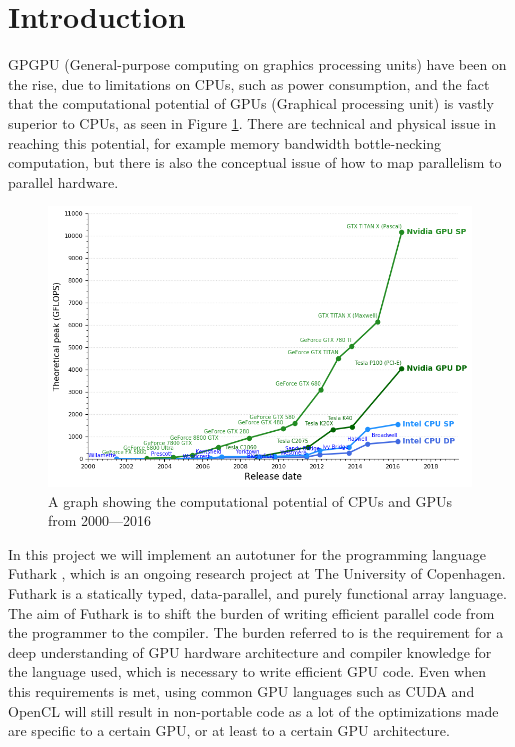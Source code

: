 \section{Introduction}
GPGPU (General-purpose computing on graphics processing units) have been on the
rise, due to limitations on CPUs, such as power consumption, and the fact
that the computational potential of GPUs (Graphical processing unit) is vastly
superior to CPUs, as seen in Figure \ref{potential}. There are technical and physical
issue in reaching this potential, for example memory bandwidth bottle-necking computation, but there is
also the conceptual issue of how to map parallelism to parallel hardware.
\begin{figure}[h]
	\centering
	\includegraphics[width=.8\textwidth]{resources/graf.png}
	\caption{A graph showing the computational potential of CPUs and GPUs from 2000---2016 \cite{cpu-vs-gpu}}
	\label{potential}
\end{figure}

In this project we will implement an autotuner for the programming language
Futhark \cite{futhark-home}, which is an ongoing research project at The University of Copenhagen. Futhark is a statically typed, data-parallel, and
purely functional array language. The aim of Futhark is to shift the burden of
writing efficient parallel code from the programmer to the compiler. The
burden referred to is the requirement for a deep understanding of GPU hardware architecture and compiler knowledge for the language used, which is necessary to write efficient GPU code. Even when this requirements is met, using common GPU languages such as CUDA and OpenCL will still result in non-portable code as a lot of the optimizations made
are specific to a certain GPU, or at least to a certain GPU architecture. 

